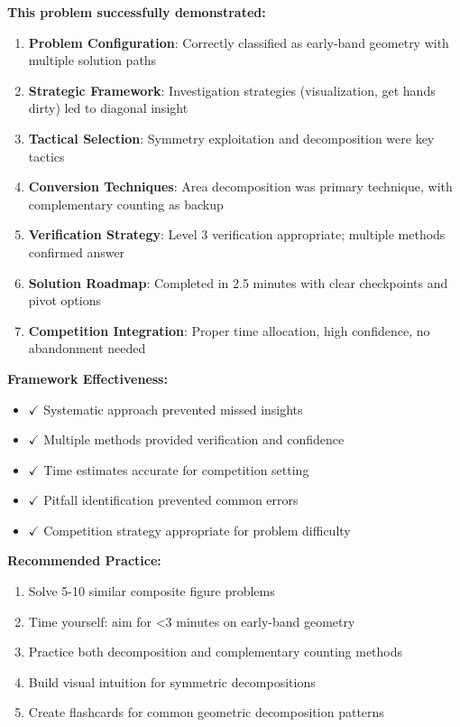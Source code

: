 \documentclass[11pt]{article}
\begin{document}
\textbf{This problem successfully demonstrated:}
\begin{enumerate}
    \item \textbf{Problem Configuration}: Correctly classified as early-band geometry with multiple solution paths
    \item \textbf{Strategic Framework}: Investigation strategies (visualization, get hands dirty) led to diagonal insight
    \item \textbf{Tactical Selection}: Symmetry exploitation and decomposition were key tactics
    \item \textbf{Conversion Techniques}: Area decomposition was primary technique, with complementary counting as backup
    \item \textbf{Verification Strategy}: Level 3 verification appropriate; multiple methods confirmed answer
    \item \textbf{Solution Roadmap}: Completed in 2.5 minutes with clear checkpoints and pivot options
    \item \textbf{Competition Integration}: Proper time allocation, high confidence, no abandonment needed
\end{enumerate}

\textbf{Framework Effectiveness:}
\begin{itemize}
    \item $\checkmark$ Systematic approach prevented missed insights
    \item $\checkmark$ Multiple methods provided verification and confidence
    \item $\checkmark$ Time estimates accurate for competition setting
    \item $\checkmark$ Pitfall identification prevented common errors
    \item $\checkmark$ Competition strategy appropriate for problem difficulty
\end{itemize}

\textbf{Recommended Practice:}
\begin{enumerate}
    \item Solve 5-10 similar composite figure problems
    \item Time yourself: aim for <3 minutes on early-band geometry
    \item Practice both decomposition and complementary counting methods
    \item Build visual intuition for symmetric decompositions
    \item Create flashcards for common geometric decomposition patterns
\end{enumerate}
\end{document}
